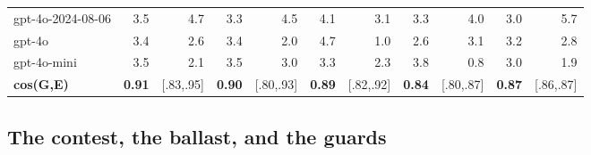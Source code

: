 \documentclass{article}
\begin{document}
\begin{table}[H]
\begin{center}
{\begin{tabular}{@{}lrrrrrrrrrr@{}}
gpt-4o-2024-08-06 &\cellcolor[HTML]{8DD3BA}\textcolor[HTML]{000000}{3.5}&\cellcolor[HTML]{50BCC2}\textcolor[HTML]{000000}{4.7}&\cellcolor[HTML]{99D7B8}\textcolor[HTML]{000000}{3.3}&\cellcolor[HTML]{5ABFC0}\textcolor[HTML]{000000}{4.5}&\cellcolor[HTML]{6EC7BE}\textcolor[HTML]{000000}{4.1}&\cellcolor[HTML]{A4DCB7}\textcolor[HTML]{000000}{3.1}&\cellcolor[HTML]{99D7B8}\textcolor[HTML]{000000}{3.3}&\cellcolor[HTML]{73C8BD}\textcolor[HTML]{000000}{4.0}&\cellcolor[HTML]{AADEB7}\textcolor[HTML]{000000}{3.0}&\cellcolor[HTML]{2DA1C2}\textcolor[HTML]{FFFFFF}{5.7} \\
gpt-4o &\cellcolor[HTML]{93D5B9}\textcolor[HTML]{000000}{3.4}&\cellcolor[HTML]{C1E7B5}\textcolor[HTML]{000000}{2.6}&\cellcolor[HTML]{93D5B9}\textcolor[HTML]{000000}{3.4}&\cellcolor[HTML]{D6EFB3}\textcolor[HTML]{000000}{2.0}&\cellcolor[HTML]{50BCC2}\textcolor[HTML]{000000}{4.7}&\cellcolor[HTML]{F1F9B9}\textcolor[HTML]{000000}{1.0}&\cellcolor[HTML]{C1E7B5}\textcolor[HTML]{000000}{2.6}&\cellcolor[HTML]{A4DCB7}\textcolor[HTML]{000000}{3.1}&\cellcolor[HTML]{9FD9B8}\textcolor[HTML]{000000}{3.2}&\cellcolor[HTML]{B6E2B6}\textcolor[HTML]{000000}{2.8} \\
gpt-4o-mini &\cellcolor[HTML]{8DD3BA}\textcolor[HTML]{000000}{3.5}&\cellcolor[HTML]{D3EEB3}\textcolor[HTML]{000000}{2.1}&\cellcolor[HTML]{8DD3BA}\textcolor[HTML]{000000}{3.5}&\cellcolor[HTML]{AADEB7}\textcolor[HTML]{000000}{3.0}&\cellcolor[HTML]{99D7B8}\textcolor[HTML]{000000}{3.3}&\cellcolor[HTML]{CDEBB4}\textcolor[HTML]{000000}{2.3}&\cellcolor[HTML]{7DCCBB}\textcolor[HTML]{000000}{3.8}&\cellcolor[HTML]{F3FBBF}\textcolor[HTML]{000000}{0.8}&\cellcolor[HTML]{AADEB7}\textcolor[HTML]{000000}{3.0}&\cellcolor[HTML]{D9F0B3}\textcolor[HTML]{000000}{1.9} \\
\textbf{cos(G,E)} &\cellcolor[HTML]{F2FABC}\textcolor[HTML]{000000}{\textbf{0.91}}& {[}.83,.95{]} &\cellcolor[HTML]{F2FABC}\textcolor[HTML]{000000}{\textbf{0.90}}& {[}.80,.93{]} &\cellcolor[HTML]{F2FABD}\textcolor[HTML]{000000}{\textbf{0.89}}& {[}.82,.92{]} &\cellcolor[HTML]{F3FABE}\textcolor[HTML]{000000}{\textbf{0.84}}& {[}.80,.87{]} &\cellcolor[HTML]{F2FABD}\textcolor[HTML]{000000}{\textbf{0.87}}& {[}.86,.87{]}  \\
\bottomrule
\end{tabular}}
\end{center}
\end{table}

\subsection{The contest, the ballast, and the guards}\label{the-contest-the-ballast-and-the-guards}
\end{document}
